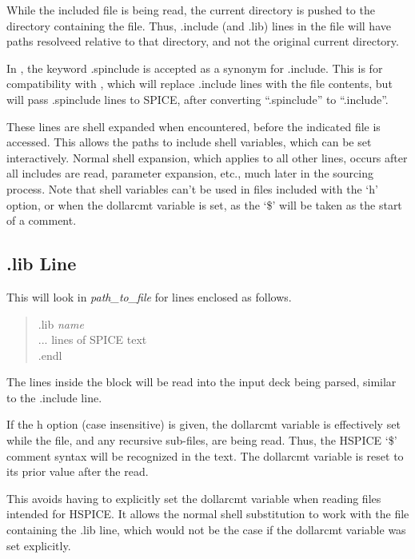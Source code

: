 While the included file is being read, the current directory is pushed
to the directory containing the file.  Thus, {\vt .include} (and {\vt
.lib}) lines in the file will have paths resolveed relative to that
directory, and not the original current directory.

In {\WRspice}, the keyword {\vt .spinclude} is accepted as a synonym
for {\vt .include}.  This is for compatibility with {\Xic}, which will
replace {\vt .include} lines with the file contents, but will pass
{\vt .spinclude} lines to SPICE, after converting ``{\vt .spinclude}''
to ``{\vt .include}''.

These lines are shell expanded when encountered, before the indicated
file is accessed.  This allows the paths to include shell variables,
which can be set interactively.  Normal shell expansion, which applies
to all other lines, occurs after all includes are read, parameter
expansion, etc., much later in the sourcing process.  Note that shell
variables can't be used in files included with the `{\vt h}' option,
or when the {\et dollarcmt} variable is set, as the `{\vt \$}' will be
taken as the start of a comment.

\subsection{{\vt .lib} Line}

This will look in {\it path\_to\_file} for lines enclosed as follows.
\begin{quote}
    {\vt .lib} {\it name}\\
    ... lines of SPICE text\\
    {\vt .endl}
\end{quote}
The lines inside the block will be read into the input deck being
parsed, similar to the {\vt .include} line.

If the {\vt h} option (case insensitive) is given, the {\et dollarcmt}
variable is effectively set while the file, and any recursive
sub-files, are being read.  Thus, the HSPICE `{\vt \$}' comment syntax
will be recognized in the text.  The {\et dollarcmt} variable is reset
to its prior value after the read.

This avoids having to explicitly set the {\et dollarcmt} variable when
reading files intended for HSPICE.  It allows the normal {\WRspice}
shell substitution to work with the file containing the {\vt .lib}
line, which would not be the case if the {\et dollarcmt} variable was
set explicitly.

